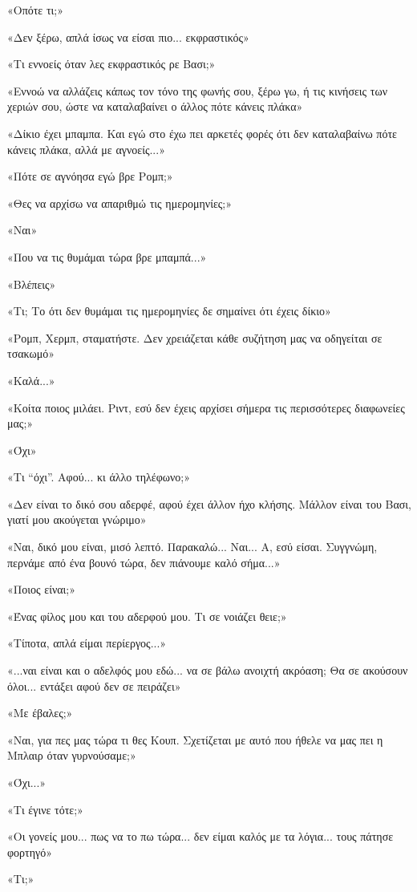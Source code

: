 \documentclass[12pt,twoside, openany]{book}
\begin{document}
«Οπότε τι;»

«Δεν ξέρω, απλά ίσως να είσαι πιο... εκφραστικός»

«Τι εννοείς όταν λες εκφραστικός ρε Βασι;»

«Εννοώ να αλλάζεις κάπως τον τόνο της φωνής σου, ξέρω γω, ή τις κινήσεις των χεριών σου, ώστε να καταλαβαίνει ο άλλος πότε κάνεις πλάκα»

«Δίκιο έχει μπαμπα. Και εγώ στο έχω πει αρκετές φορές ότι δεν καταλαβαίνω πότε κάνεις πλάκα, αλλά με αγνοείς...»

«Πότε σε αγνόησα εγώ βρε Ρομπ;»

«Θες να αρχίσω να απαριθμώ τις ημερομηνίες;»

«Ναι»

«Που να τις θυμάμαι τώρα βρε μπαμπά...»

«Βλέπεις»

«Τι; Το ότι δεν θυμάμαι τις ημερομηνίες δε σημαίνει ότι έχεις δίκιο»

«Ρομπ, Χερμπ, σταματήστε. Δεν χρειάζεται κάθε συζήτηση μας να οδηγείται σε τσακωμό»

«Καλά...»

«Κοίτα ποιος μιλάει. Ριντ, εσύ δεν έχεις αρχίσει σήμερα τις περισσότερες διαφωνείες μας;»

«Όχι»

«Τι “όχι”. Αφού... κι άλλο τηλέφωνο;»

«Δεν είναι το δικό σου αδερφέ, αφού έχει άλλον ήχο κλήσης. Μάλλον είναι του Βασι, γιατί μου ακούγεται γνώριμο»

«Ναι, δικό μου είναι, μισό λεπτό. Παρακαλώ... Ναι... Α, εσύ είσαι. Συγγνώμη, περνάμε από ένα βουνό τώρα, δεν πιάνουμε καλό σήμα...»

«Ποιος είναι;»

«Ένας φίλος μου και του αδερφού μου. Τι σε νοιάζει θειε;»

«Τίποτα, απλά είμαι περίεργος...»

«...ναι είναι και ο αδελφός μου εδώ... να σε βάλω ανοιχτή ακρόαση; Θα σε ακούσουν όλοι... εντάξει αφού δεν σε πειράζει»

«Με έβαλες;»

«Ναι, για πες μας τώρα τι θες Κουπ. Σχετίζεται με αυτό που ήθελε να μας πει η Μπλαιρ όταν γυρνούσαμε;»

«Όχι...»

«Τι έγινε τότε;»

«Οι γονείς μου... πως να το πω τώρα... δεν είμαι καλός με τα λόγια... τους πάτησε φορτηγό»

«Τι;»
\end{document}
